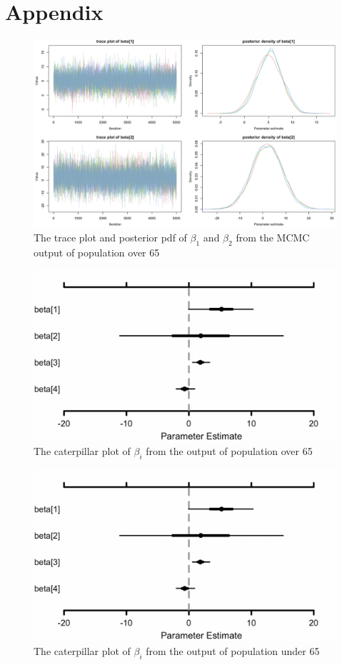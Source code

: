 \documentclass{article}
\begin{document}
\section{Appendix}
\begin{figure}[H]
\centering
\includegraphics[scale=0.3]{plot1.png}
\caption{The trace plot and posterior pdf of $\beta_1$ and $\beta_2$ from the MCMC output of population over 65}
\end{figure}
\begin{figure}[H]
\centering
\includegraphics[scale=0.3]{beta1.png}
\caption{The caterpillar plot of $\beta_i$ from the output of population over 65}
\end{figure}
\begin{figure}[H]
\centering
\includegraphics[scale=0.3]{beta1.png}
\caption{The caterpillar plot of $\beta_i$ from the output of population under 65}
\end{figure}
\end{document}
